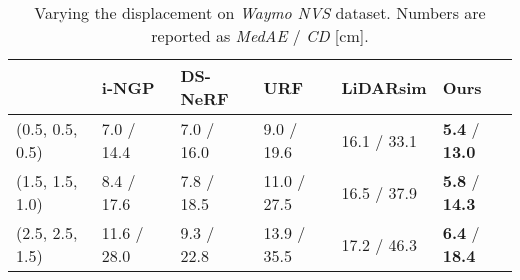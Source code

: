 
\begin{table}[t]
    \setlength{\tabcolsep}{6pt}
    \renewcommand{\arraystretch}{1.2}
	\centering
    \begin{tabularx}{\textwidth}{>{\centering\arraybackslash}m{}|YYYYY}
    \toprule
     & i-NGP & DS-NeRF & URF & LiDARsim & Ours \\
    \midrule
    (0.5, 0.5, 0.5)  & 7.0 / 14.4 & 7.0 / 16.0 & 9.0 / 19.6 & 16.1 / 33.1 & \textbf{5.4} / \textbf{13.0} \\
    (1.5, 1.5, 1.0)  & 8.4 / 17.6 & 7.8 / 18.5 & 11.0 / 27.5 & 16.5 / 37.9 & \textbf{5.8} / \textbf{14.3}  \\
    (2.5, 2.5, 1.5)  & 11.6 / 28.0 & 9.3 / 22.8 & 13.9 / 35.5 & 17.2 / 46.3 & \textbf{6.4} / \textbf{18.4} \\
    \bottomrule
    \end{tabularx}
    \caption{Varying the displacement on \textit{Waymo NVS} dataset. Numbers are reported as \textit{MedAE} / \textit{CD} [cm].}
    \label{tab:iccv_rebuttaL_nvs}
\end{table}